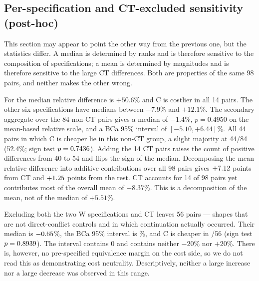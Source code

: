 \documentclass[a4paper,11pt]{article}
\newcommand{\spec}[1]{\texttt{\detokenize{#1}}}
\begin{document}
\subsection{Per-specification and CT-excluded sensitivity (post-hoc)}
This section may appear to point the other way from the previous one, but the statistics differ. A median is determined by ranks and is therefore sensitive to the composition of specifications; a mean is determined by magnitudes and is therefore sensitive to the large CT differences. Both are properties of the same 98 pairs, and neither makes the other wrong.
\begin{table}[!htbp]
\centering\small

\caption{Per-specification cost (USD) and paired relative differences. The median relative difference cannot be recomputed from the medians of B and C. Fourteen pairs per specification.}
\label{tab:per_spec}
\end{table}

For \spec{ct_library} the median relative difference is $+50.6$\% and C is costlier in all 14 pairs. The other six specifications have medians between $-7.9$\% and $+12.1$\%. The secondary aggregate over the 84 non-CT pairs gives a median of $-1.4$\%, $p=0.4950$ on the mean-based relative scale, and a BCa 95\% interval of $[-5.10,+6.44]$\%. All 44 pairs in which C is cheaper lie in this non-CT group, a slight majority at 44/84 (52.4\%; sign test $p=0.7436$). Adding the 14 CT pairs raises the count of positive differences from 40 to 54 and flips the sign of the median. Decomposing the mean relative difference into additive contributions over all 98 pairs gives $+7.12$ points from CT and $+1.25$ points from the rest. CT accounts for 14 of 98 pairs yet contributes most of the overall mean of $+8.37$\%. This is a decomposition of the mean, not of the median of $+5.51$\%.

Excluding both the two W specifications and CT leaves 56 pairs --- shapes that are not direct-conflict controls and in which continuation actually occurred. Their median is $-0.65$\%, the BCa 95\% interval is \ActiveNonCTCI\%, and C is cheaper in \ActiveNonCTCheaper/56 (sign test $p=0.8939$). The interval contains 0 and contains neither $-20$\% nor $+20$\%. There is, however, no pre-specified equivalence margin on the cost side, so we do not read this as demonstrating cost neutrality. Descriptively, neither a large increase nor a large decrease was observed in this range.
\end{document}
